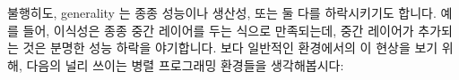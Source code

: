 
불행히도, generality 는 종종 성능이나 생산성, 또는 둘 다를 하락시키기도 합니다.
예를 들어, 이식성은 종종 중간 레이어를 두는 식으로 만족되는데, 중간 레이어가
추가되는 것은 분명한 성능 하락을 야기합니다.
보다 일반적인 환경에서의 이 현상을 보기 위해, 다음의 널리 쓰이는 병렬
프로그래밍 환경들을 생각해봅시다:


